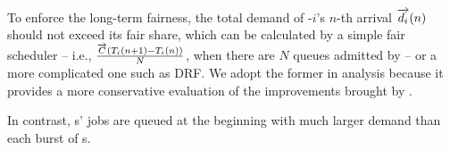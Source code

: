 
To enforce the long-term fairness, the total demand of {\burstq}-$i$'s $n$-th arrival $\protect\overrightarrow{d_i}(n)$ should not exceed its fair share, which can be calculated by a simple fair scheduler -- i.e., $\frac{\protect\overrightarrow{C}(T_i(n+1)-T_i(n))}{N}$, when there are $N$ queues admitted by {\name} -- or a more complicated one such as DRF. We adopt the former in analysis because it provides a more conservative evaluation of the improvements brought by {\name}. 


In contrast, {{\batchq}}s' jobs are queued at the beginning with much larger demand than each burst of {\burstq}s. %


